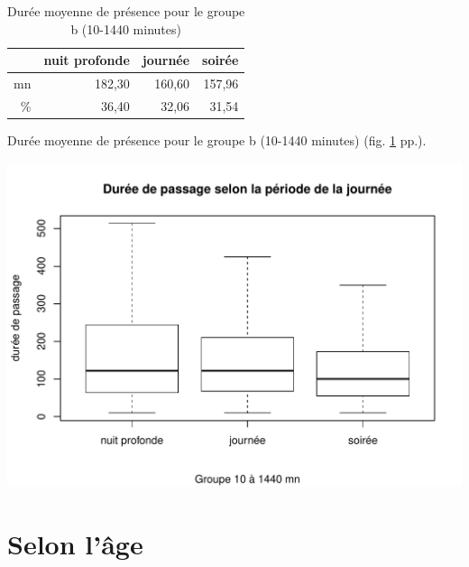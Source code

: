 \documentclass[12pt,english,french,twoside]{book}\usepackage[]{graphicx}\usepackage[]{color}
\makeatletter
\def\maxwidth{ %
  \ifdim\Gin@nat@width>\linewidth
    \linewidth
  \else
    \Gin@nat@width
  \fi
}
\newenvironment{knitrout}{}{} %
\makeatother
\begin{document}
\begin{table}[ht]
\centering
\begin{tabular}{rrrr}
  \hline
 & nuit profonde & journée & soirée \\ 
  \hline
mn & 182,30 & 160,60 & 157,96 \\ 
  \% & 36,40 & 32,06 & 31,54 \\ 
   \hline
\end{tabular}
\caption{Durée moyenne de présence pour le groupe b (10-1440 minutes)} 
\label{b_periode}
\end{table}


Durée moyenne de présence pour le groupe b (10-1440 minutes) (fig. \ref{b_periode} pp.\pageref{b_periode}).

\begin{center}
\begin{knitrout}
\color{fgcolor}
\includegraphics[width=\maxwidth]{figure/periode_4-1} 

\end{knitrout}
\end{center}



\section{Selon l'âge}
\end{document}
